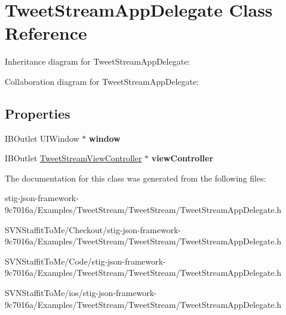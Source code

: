 \hypertarget{interface_tweet_stream_app_delegate}{
\section{\-Tweet\-Stream\-App\-Delegate \-Class \-Reference}
\label{interface_tweet_stream_app_delegate}
}


\-Inheritance diagram for \-Tweet\-Stream\-App\-Delegate\-:


\-Collaboration diagram for \-Tweet\-Stream\-App\-Delegate\-:
\subsection*{\-Properties}
\begin{DoxyCompactItemize}
\item 
\hypertarget{interface_tweet_stream_app_delegate_a8f8a1c37b55ad83114e5046f6cc09d83}{
\-I\-B\-Outlet \-U\-I\-Window $\ast$ {\bfseries window}}
\label{interface_tweet_stream_app_delegate_a8f8a1c37b55ad83114e5046f6cc09d83}

\item 
\hypertarget{interface_tweet_stream_app_delegate_ab0d15ca5b3965093c090e9788bc4daec}{
\-I\-B\-Outlet \*
\hyperlink{interface_tweet_stream_view_controller}{\-Tweet\-Stream\-View\-Controller} $\ast$ {\bfseries view\-Controller}}
\label{interface_tweet_stream_app_delegate_ab0d15ca5b3965093c090e9788bc4daec}

\end{DoxyCompactItemize}


\-The documentation for this class was generated from the following files\-:\begin{DoxyCompactItemize}
\item 
stig-\/json-\/framework-\/9c7016a/\-Examples/\-Tweet\-Stream/\-Tweet\-Stream/\-Tweet\-Stream\-App\-Delegate.\-h\item 
\-S\-V\-N\-Staffit\-To\-Me/\-Checkout/stig-\/json-\/framework-\/9c7016a/\-Examples/\-Tweet\-Stream/\-Tweet\-Stream/\-Tweet\-Stream\-App\-Delegate.\-h\item 
\-S\-V\-N\-Staffit\-To\-Me/\-Code/stig-\/json-\/framework-\/9c7016a/\-Examples/\-Tweet\-Stream/\-Tweet\-Stream/\-Tweet\-Stream\-App\-Delegate.\-h\item 
\-S\-V\-N\-Staffit\-To\-Me/ios/stig-\/json-\/framework-\/9c7016a/\-Examples/\-Tweet\-Stream/\-Tweet\-Stream/\-Tweet\-Stream\-App\-Delegate.\-h\end{DoxyCompactItemize}
